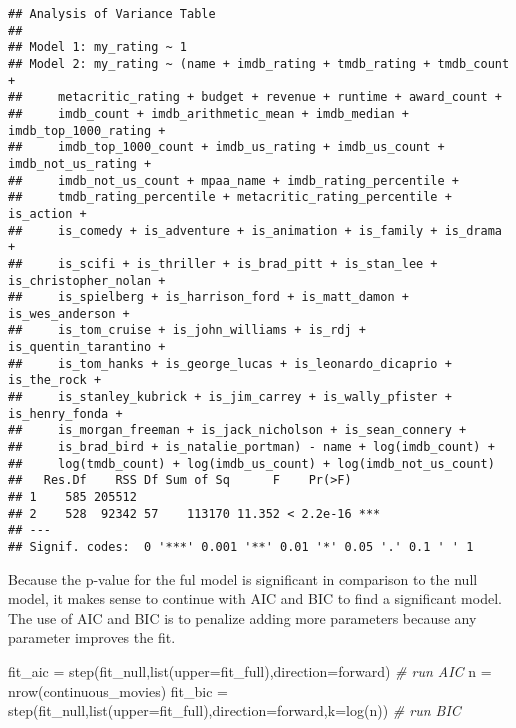 \documentclass[
]{article}
\newenvironment{Shaded}{\begin{snugshade}}{\end{snugshade}}
\newcommand{\AttributeTok}[1]{\textcolor[rgb]{0.77,0.63,0.00}{#1}}
\newcommand{\CommentTok}[1]{\textcolor[rgb]{0.56,0.35,0.01}{\textit{#1}}}
\newcommand{\FunctionTok}[1]{\textcolor[rgb]{0.00,0.00,0.00}{#1}}
\newcommand{\NormalTok}[1]{#1}
\newcommand{\OtherTok}[1]{\textcolor[rgb]{0.56,0.35,0.01}{#1}}
\newcommand{\StringTok}[1]{\textcolor[rgb]{0.31,0.60,0.02}{#1}}
\begin{document}
\begin{verbatim}
## Analysis of Variance Table
## 
## Model 1: my_rating ~ 1
## Model 2: my_rating ~ (name + imdb_rating + tmdb_rating + tmdb_count + 
##     metacritic_rating + budget + revenue + runtime + award_count + 
##     imdb_count + imdb_arithmetic_mean + imdb_median + imdb_top_1000_rating + 
##     imdb_top_1000_count + imdb_us_rating + imdb_us_count + imdb_not_us_rating + 
##     imdb_not_us_count + mpaa_name + imdb_rating_percentile + 
##     tmdb_rating_percentile + metacritic_rating_percentile + is_action + 
##     is_comedy + is_adventure + is_animation + is_family + is_drama + 
##     is_scifi + is_thriller + is_brad_pitt + is_stan_lee + is_christopher_nolan + 
##     is_spielberg + is_harrison_ford + is_matt_damon + is_wes_anderson + 
##     is_tom_cruise + is_john_williams + is_rdj + is_quentin_tarantino + 
##     is_tom_hanks + is_george_lucas + is_leonardo_dicaprio + is_the_rock + 
##     is_stanley_kubrick + is_jim_carrey + is_wally_pfister + is_henry_fonda + 
##     is_morgan_freeman + is_jack_nicholson + is_sean_connery + 
##     is_brad_bird + is_natalie_portman) - name + log(imdb_count) + 
##     log(tmdb_count) + log(imdb_us_count) + log(imdb_not_us_count)
##   Res.Df    RSS Df Sum of Sq      F    Pr(>F)    
## 1    585 205512                                  
## 2    528  92342 57    113170 11.352 < 2.2e-16 ***
## ---
## Signif. codes:  0 '***' 0.001 '**' 0.01 '*' 0.05 '.' 0.1 ' ' 1
\end{verbatim}

Because the p-value for the ful model is significant in comparison to
the null model, it makes sense to continue with AIC and BIC to find a
significant model. The use of AIC and BIC is to penalize adding more
parameters because any parameter improves the fit.

\begin{Shaded}
\begin{Highlighting}[]
\NormalTok{fit\_aic }\OtherTok{=} \FunctionTok{step}\NormalTok{(fit\_null,}\FunctionTok{list}\NormalTok{(}\AttributeTok{upper=}\NormalTok{fit\_full),}\AttributeTok{direction=}\StringTok{\textquotesingle{}forward\textquotesingle{}}\NormalTok{) }\CommentTok{\# run AIC}
\NormalTok{n }\OtherTok{=} \FunctionTok{nrow}\NormalTok{(continuous\_movies)}
\NormalTok{fit\_bic }\OtherTok{=} \FunctionTok{step}\NormalTok{(fit\_null,}\FunctionTok{list}\NormalTok{(}\AttributeTok{upper=}\NormalTok{fit\_full),}\AttributeTok{direction=}\StringTok{\textquotesingle{}forward\textquotesingle{}}\NormalTok{,}\AttributeTok{k=}\FunctionTok{log}\NormalTok{(n)) }\CommentTok{\# run BIC}
\end{Highlighting}
\end{Shaded}
\end{document}
